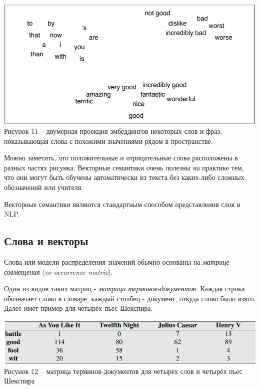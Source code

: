 \documentclass[a4paper,12pt,preview]{report} %
\begin{document}
	
	\begin{center}
		\includegraphics[scale=0.6]{sema.PNG}
		\\ Рисунок 11 -- двумерная проекция эмбеддингов некоторых слов и фраз, показывающая слова с похожими значениями рядом в пространстве.
	\end{center}
	
	Можно заметить, что положительные и отрицательные слова расположены в разных частях рисунка.
	Векторные семантики очень полезны на практике тем, что они могут быть обучены автоматически из текста без каких-либо сложных обозначений или учителя.
	
	Векторные семантики являются стандартным способом представления слов в NLP.
	
	
	\subsection{Слова и векторы}
	
	Слова или модели распределения значений обычно основаны на \textit{матрице совмещения} (\textit{co-occurrence matrix}).
	
	Один из видов таких матриц - \textit{матрица терминов-документов}. Каждая строка обозначает слово в словаре, каждый столбец - документ, откуда слово было взято. Далее имет пример для четырёх пьес Шекспира.
	
	
	\begin{center}
		\includegraphics[scale=0.6]{shake.PNG}
		\\ Рисунок 12 -- матрица терминов-документов для четырёх слов и четырёх пьес Шекспира
	\end{center}
	
\end{document}
